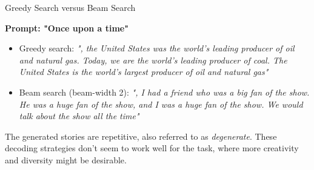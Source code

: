 




    


\begin{frame}{Greedy Search versus Beam Search}

\vspace{2ex}
\textbf{Prompt: "Once upon a time"}
\begin{itemize}
\item Greedy search: \textit{", the United States was the world's leading producer of oil and natural gas. Today, we are the world's leading producer of coal. 
The United States is the world's largest producer of oil and natural gas"}
\item Beam search (beam-width 2): \textit{", I had a friend who was a big fan of the show. He was a huge fan of the show, and I was a huge fan of the show. We would talk about the show all the time"}
\end{itemize}
\vspace{2ex}
The generated stories are repetitive, also referred to as \textit{degenerate}. These decoding strategies don't seem to work well for the task, where more creativity and diversity might be desirable.\\
\vspace{2ex}



\end{frame}


